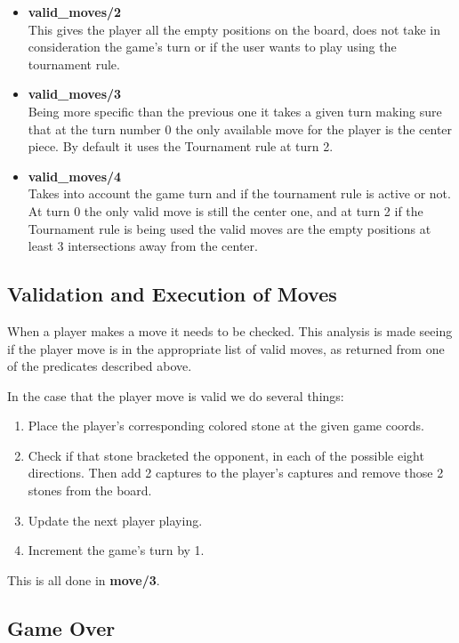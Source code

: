 \documentclass[12pt,a4paper,notitlepage]{article}
\begin{document}
\begin{itemize}
	\item \textbf{valid\_moves/2}\\
	This gives the player all the empty positions on the board, does not take in consideration the game's turn or if the user wants to play using the tournament rule.
	\item \textbf{valid\_moves/3}\\
	Being more specific than the previous one it takes a given turn making sure that at the turn number 0 the only available move for the player is the center piece.
	By default it uses the Tournament rule at turn 2.
	\item \textbf{valid\_moves/4}\\
	Takes into account the game turn and if the tournament rule is active or not. At turn 0 the only valid move is still the center one, and at turn 2 if the Tournament rule is being used the valid moves are the empty positions at least 3 intersections away from the center.
\end{itemize}

\subsection{Validation and Execution of Moves}
\label{subsec:moves}

When a player makes a move it needs to be checked. This analysis is made seeing if the player move is in the appropriate list of valid moves, as returned from one of the predicates described above.

In the case that the player move is valid we do several things:

\begin{enumerate}[label=(\alph*)]
	\item Place the player's corresponding colored stone at the given game coords.
	\item Check if that stone bracketed the opponent, in each of the possible eight directions. Then add 2 captures to the player's captures and remove those 2 stones from the board.
	\item Update the next player playing.
	\item Increment the game's turn by 1.
\end{enumerate}

This is all done in \textbf{move/3}.

\subsection{Game Over}
\label{subsec:gameover}
\end{document}
